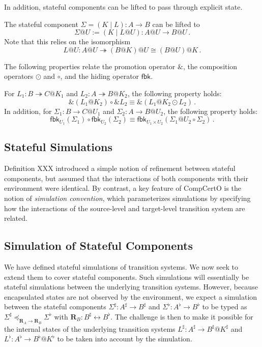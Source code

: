 \documentclass[acmsmall,screen,review,anonymous]{acmart}
\newcommand{\kw}[1]{\ensuremath{ \mathsf{#1} }}
\renewcommand{\preceq}{\preccurlyeq}
\begin{document}
In addition,
stateful components can be lifted
to pass through explicit state.

\begin{definition} \label{def:slift}
The stateful component $\Sigma = (K \mid L) : A \rightarrow B$
can be lifted to \[ \Sigma@U := (K \mid L@U) : A@U \rightarrow B@U \,. \]
Note that this relies on the isomorphism
\[
  L@U : A@U \twoheadrightarrow (B@K)@U \cong (B@U)@K
  \,.
\]
\end{definition}

The following properties
relate the promotion operator $\&$,
the composition operators $\odot$ and $\circ$,
and the hiding operator $\kw{fbk}$.

\begin{lemma}
  For $L_1 : B \twoheadrightarrow C@K_1$ and
  $L_2 : A \twoheadrightarrow B@K_2$,
  the following property holds:
  \[
    \&(L_1@K_2) \circ \&L_2 \equiv \&(L_1@K_2 \odot L_2)
    \,.
  \]
  In addition, for $\Sigma_1 : B \rightarrow C@U_1$
  and $\Sigma_2 : A \rightarrow B@U_2$,
  the following property holds:
  \[
    \kw{fbk}_{U_1}(\Sigma_1) \circ \kw{fbk}_{U_2}(\Sigma_2) \equiv
    \kw{fbk}_{U_1 \times U_2}(\Sigma_1@U_2 \circ \Sigma_2)
    \,.
  \]
\end{lemma}


\subsection{Stateful Simulations} %

Definition XXX introduced a simple notion of refinement
between stateful components,
but assumed that the interactions of both components
with their environment were identical.
By contrast, a key feature of CompCertO
is the notion of \emph{simulation convention},
which parameterizes simulations by
specifying how the interactions of
the source-level and target-level transition system
are related.


\subsection{Simulation of Stateful Components} %

We have defined stateful simulations of transition systems.
We now seek to extend them to cover stateful components.
Such simulations will essentially be
stateful simulations between the underlying transition systems.
However,
because encapsulated states are not observed by the environment,
we expect a simulation between the stateful components
$\Sigma^\sharp : A^\sharp \rightarrow B^\sharp$ and
$\Sigma^\flat : A^\flat \rightarrow B^\flat$
to be typed as
$
  \Sigma^\sharp \preceq_{\mathbf{R}_A \rightarrow \mathbf{R}_B}
  \Sigma^\flat
$
with $\mathbf{R}_B : B^\sharp \leftrightarrow B^\flat$.
The challenge is then to make it possible for
the internal states of the underlying transition systems
$L^\sharp : A^\sharp \rightarrow B^\sharp@K^\sharp$
and
$L^\flat : A^\flat \rightarrow B^\flat@K^\flat$
to be taken into account by the simulation.
\end{document}

